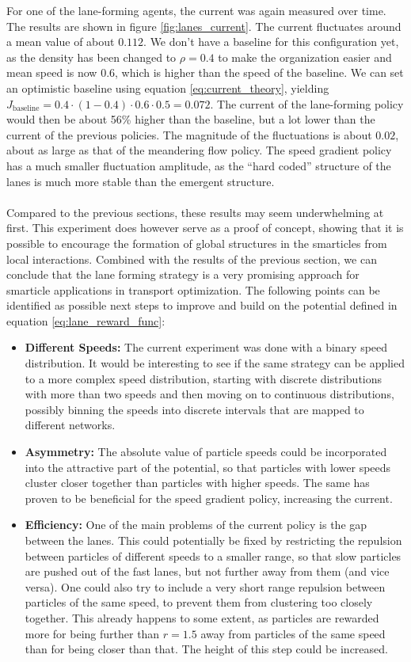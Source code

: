 For one of the lane-forming agents, the current was again measured over time. The results are shown in figure \ref{fig:lanes_current}. The current fluctuates around a mean value of about $0.112$. We don't have a baseline for this configuration yet, as the density has been changed to $\rho=0.4$ to make the organization easier and mean speed is now $0.6$, which is higher than the speed of the baseline. We can set an optimistic baseline using equation \ref{eq:current_theory}, yielding $J_{\text{baseline}}=0.4\cdot(1-0.4)\cdot0.6\cdot0.5=0.072$. The current of the lane-forming policy would then be about 56\% higher than the baseline, but a lot lower than the current of the previous policies. The magnitude of the fluctuations is about $0.02$, about as large as that of the meandering flow policy. The speed gradient policy has a much smaller fluctuation amplitude, as the \enquote{hard coded} structure of the lanes is much more stable than the emergent structure.
\\
\\
Compared to the previous sections, these results may seem underwhelming at first. This experiment does however serve as a proof of concept, showing that it is possible to encourage the formation of global structures in the smarticles from local interactions. Combined with the results of the previous section, we can conclude that the lane forming strategy is a very promising approach for smarticle applications in transport optimization. The following points can be identified as possible next steps to improve and build on the potential defined in equation \ref{eq:lane_reward_func}:
\begin{itemize}
    \item \textbf{Different Speeds:} The current experiment was done with a binary speed distribution. It would be interesting to see if the same strategy can be applied to a more complex speed distribution, starting with discrete distributions with more than two speeds and then moving on to continuous distributions, possibly binning the speeds into discrete intervals that are mapped to different networks. 
    \item \textbf{Asymmetry:} The absolute value of particle speeds could be incorporated into the attractive part of the potential, so that particles with lower speeds cluster closer together than particles with higher speeds. The same has proven to be beneficial for the speed gradient policy, increasing the current.
    \item \textbf{Efficiency:} One of the main problems of the current policy is the gap between the lanes. This could potentially be fixed by restricting the repulsion between particles of different speeds to a smaller range, so that slow particles are pushed out of the fast lanes, but not further away from them (and vice versa). One could also try to include a very short range repulsion between particles of the same speed, to prevent them from clustering too closely together. This already happens to some extent, as particles are rewarded more for being further than $r=1.5$ away from particles of the same speed than for being closer than that. The height of this step could be increased. 
\end{itemize}

